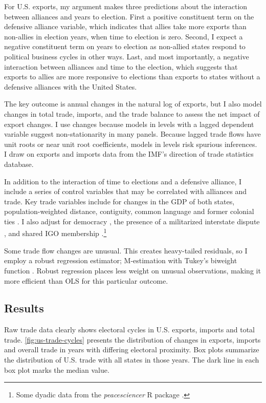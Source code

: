 \documentclass[12pt]{article}
\begin{document}
For U.S. exports, my argument makes three predictions about the interaction between alliances and years to election. 
First a positive constituent term on the defensive alliance variable, which indicates that allies take more exports than non-allies in election years, when time to election is zero.
Second, I expect a negative constituent term on years to election as non-allied states respond to political business cycles in other ways.
Last, and most importantly, a negative interaction between alliances and time to the election, which suggests that exports to allies are more responsive to elections than exports to states without a defensive alliances with the United States.


The key outcome is annual changes in the natural log of exports, but I also model changes in total trade, imports, and the trade balance to assess the net impact of export changes.
I use changes because models in levels with a lagged dependent variable suggest non-stationarity in many panels. 
Because lagged trade flows have unit roots or near unit root coefficients, models in levels risk spurious inferences.
I draw on exports and imports data from the IMF's direction of trade statistics database.


In addition to the interaction of time to elections and a defensive alliance, I include a series of control variables that may be correlated with alliances and trade. 
Key trade variables include for changes in the GDP of both states, population-weighted distance, contiguity, common language and former colonial ties \citep{FouquinHugot2016}.
I also adjust for democracy \citep{Marquez2016}, the presence of a militarized interstate dispute \citep{Gibleretal2016}, and shared IGO membership \citep{Pevehouseetal2020}.\footnote{Some dyadic data from the \textit{peacesciencer} \textsf{R} package \citep{peacesciencer-package}.}


Some trade flow changes are unusual. 
This creates heavy-tailed residuals, so I employ a robust regression estimator; M-estimation with Tukey's biweight function \citep{RaineyBaissa2020}.
Robust regression places less weight on unusual observations, making it more efficient than OLS for this particular outcome.



\subsection{Results}


Raw trade data clearly shows electoral cycles in U.S. exports, imports and total trade. 
\autoref{fig:us-trade-cycles} presents the distribution of changes in exports, imports and overall trade in years with differing electoral proximity.
Box plots summarize the distribution of U.S. trade with all states in those years. 
The dark line in each box plot marks the median value. 
\end{document}
